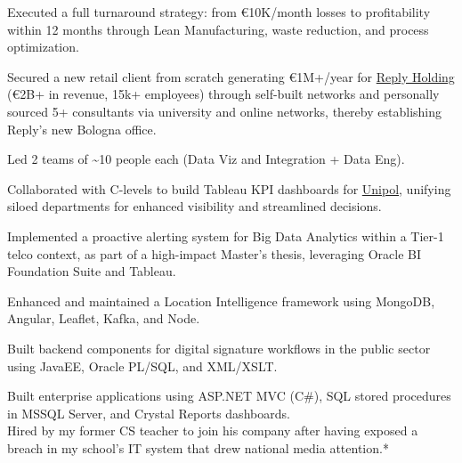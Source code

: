 \documentclass[]{deedy-resume-cv}
\begin{document}
\begin{minipage}[t]{0.60\textwidth}
\begin{tightemize}
\item Executed a full turnaround strategy: from €10K/month losses to profitability within 12 months through Lean Manufacturing, waste reduction, and process optimization.
\end{tightemize}

\sectionsep
{}
\begin{tightemize}
\item Secured a new retail client from scratch generating €1M+/year for \href{https://www.reply.com}{Reply Holding} (€2B+ in revenue, 15k+ employees) through self-built networks and personally sourced 5+ consultants via university and online networks, thereby establishing Reply's new Bologna office.

\item Led 2 teams of \~{}10 people each (Data Viz and Integration + Data Eng).

\item Collaborated with C-levels to build Tableau KPI dashboards for \href{https://www.unipol.it/}{Unipol}, unifying siloed departments for enhanced visibility and streamlined decisions.
\end{tightemize}

\sectionsep
{}
\begin{tightemize}
\item Implemented a proactive alerting system for Big Data Analytics within a Tier-1 telco context, as part of a high-impact Master's thesis, leveraging Oracle BI Foundation Suite and Tableau.
\item Enhanced and maintained a Location Intelligence framework using MongoDB, Angular, Leaflet, Kafka, and Node. 
\end{tightemize}

\sectionsep
{}
Built backend components for digital signature workflows in the public sector using JavaEE, Oracle PL/SQL, and XML/XSLT.

\sectionsep
{}
Built enterprise applications using ASP.NET MVC (C\#), SQL stored procedures in MSSQL Server, and Crystal Reports dashboards.\\
\vspace{1pt}
Hired by my former CS teacher to join his company after having exposed a breach in my school's IT system that drew national media attention.*

%
%
\end{minipage}
\end{document}
